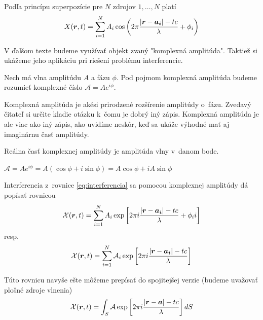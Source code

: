Podľa princípu superpozície pre $N$ zdrojov $1,\dots,N$ platí
\begin{equation}
X(\boldsymbol{r},t)=\sum_{i=1}^{N} A_i \cos \left(2 \pi
\frac{|\boldsymbol{r}-\boldsymbol{a_i}| - t c}{\lambda}+\phi_i \right)
\label{eq:interferencia}
\end{equation}

V ďalšom texte budeme využívať objekt zvaný "komplexná amplitúda".
Taktiež si ukážeme jeho aplikáciu pri riešení problému interferencie.

\begin{definicia}
Nech má vlna amplitúdu $A$ a fázu $\phi$.
Pod pojmom komplexná amplitúda budeme rozumieť komplexné číslo
$\mathcal{A}=A e^{i \phi}$.
\end{definicia}

\begin{poznamka}
 Komplexná amplitúda je akési prirodzené rozšírenie amplitúdy 
 o~fázu. Zvedavý čitateľ si určite kladie otázku k~čomu je dobrý iný
 zápis. Komplexná amplitúda je ale viac ako iný zápis, ako uvidíme
 neskôr, keď sa ukáže výhodné mať aj imaginárnu časť amplitúdy.
\end{poznamka}


\begin{lema}
Reálna časť komplexnej amplitúdy je amplitúda vlny v~danom bode.
\end{lema}
\begin{dokaz}
$\mathcal{A}=A e^{i \phi} = A (\cos \phi + i \sin \phi) =
A \cos \phi + i A \sin \phi$
\end{dokaz}

\begin{lema}
Interferencia z~rovnice \ref{eq:interferencia} sa pomocou
komplexnej amplitúdy dá popísať rovnicou
\begin{equation}
\mathcal{X}(\boldsymbol{r},t)=\sum_{i=1}^{N} 
A_i 
\exp \left[2 \pi i
\frac{|\boldsymbol{r}-\boldsymbol{a_i}| - t c}{\lambda}+ \phi_i i \right]
\end{equation}
resp.
\begin{equation}
\mathcal{X}(\boldsymbol{r},t)=\sum_{i=1}^{N} 
\mathcal{A}_i \exp \left[2 \pi i \frac{|\boldsymbol{r}-\boldsymbol{a_i}|
-tc}{\lambda}  \right]
\end{equation} 
\end{lema}

Túto rovnicu navyše ešte môžeme prepísať do spojitejšej verzie (budeme
uvažovať plošné zdroje vlnenia)
\begin{equation}
\mathcal{X}(\boldsymbol{r},t)=\int_S
 \mathcal{A} \exp \left[2 \pi i \frac{|\boldsymbol{r}-\boldsymbol{a}|
 -tc}{\lambda} \right] dS
\end{equation}

